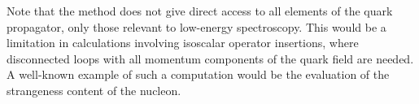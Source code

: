 Note that the method does not give direct access to all elements of the quark
propagator, only those relevant to low-energy spectroscopy. This would be a
limitation in calculations involving isoscalar operator insertions, where
disconnected loops with all momentum components of the quark field are needed.
A well-known example of such a computation would be the evaluation of the
strangeness content of the nucleon.
